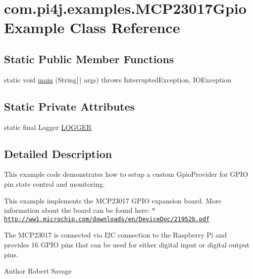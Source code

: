\hypertarget{classcom_1_1pi4j_1_1examples_1_1MCP23017GpioExample}{}\section{com.\+pi4j.\+examples.\+M\+C\+P23017\+Gpio\+Example Class Reference}
\label{classcom_1_1pi4j_1_1examples_1_1MCP23017GpioExample}
\subsection*{Static Public Member Functions}
\begin{DoxyCompactItemize}
\item 
static void \hyperlink{classcom_1_1pi4j_1_1examples_1_1MCP23017GpioExample_adde74bf11cb8efcef4c15ed3a9a546b2}{main} (String\mbox{[}$\,$\mbox{]} args)  throws Interrupted\+Exception,             I\+O\+Exception 
\end{DoxyCompactItemize}
\subsection*{Static Private Attributes}
\begin{DoxyCompactItemize}
\item 
static final Logger \hyperlink{classcom_1_1pi4j_1_1examples_1_1MCP23017GpioExample_a4d89402b7b53544ff7c38be922407217}{L\+O\+G\+G\+E\+R}
\end{DoxyCompactItemize}


\subsection{Detailed Description}
This example code demonstrates how to setup a custom Gpio\+Provider for G\+P\+I\+O pin state control and monitoring. 

This example implements the M\+C\+P23017 G\+P\+I\+O expansion board. More information about the board can be found here\+: $\ast$ \href{http://ww1.microchip.com/downloads/en/DeviceDoc/21952b.pdf}{\tt http\+://ww1.\+microchip.\+com/downloads/en/\+Device\+Doc/21952b.\+pdf} 

The M\+C\+P23017 is connected via I2\+C connection to the Raspberry Pi and provides 16 G\+P\+I\+O pins that can be used for either digital input or digital output pins. 

\begin{DoxyAuthor}{Author}
Robert Savage 
\end{DoxyAuthor}


